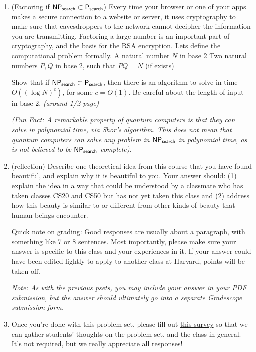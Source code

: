 \documentclass[11pt]{article}
\begin{document}
\begin{enumerate}
\item (Factoring if $\mathsf{NP_{search}}\subset \mathsf{P_{search}}$) Every time your browser or one of your apps makes a secure connection to a website or server, it uses cryptography to make sure that eavesdroppers to the network cannot decipher the information you are transmitting. Factoring a large number is an important part of cryptography, and the basis for the RSA encryption. Lets define the computational problem formally.
\compprob{\Factoring}
        {A natural number $N$ in base 2}
        {Two natural numbers $P,Q$ in base 2, such that $PQ=N$ (if exists)}

Show that if $\mathsf{NP_{search}}\subset \mathsf{P_{search}}$, then there is an algorithm to solve \Factoring in time $O((\log N)^c)$, for some $c=O(1)$. Be careful about the length of input in base 2. \textit{(around 1/2 page)}

\textit{(Fun Fact: A remarkable property of quantum computers is that they can solve \Factoring in polynomial time, via Shor's algorithm. This does not mean that quantum computers can solve any problem in $\mathsf{NP_{search}}$ in polynomial time, as \Factoring is not believed to be $\mathsf{NP_{search}}$-complete).
}\\

\item (reflection) Describe one theoretical idea from this course that you have found beautiful, and explain why it is beautiful to you.  Your answer should: (1) explain the idea in a way that could be understood by a classmate who has taken classes CS20 and CS50 but has not yet taken this class and (2) address how this beauty is similar to or different from other kinds of beauty that human beings encounter.

Quick note on grading: Good responses are usually about a paragraph, with something like 7 or 8 sentences. Most importantly, please make sure your answer is specific to this class and your experiences in it. If your answer could have been edited lightly to apply to another class at Harvard, points will be taken off.

\textit{Note: As with the previous psets, you may include your answer in your PDF submission, but the answer should ultimately go into a separate Gradescope submission form.}

\item Once you're done with this problem set, please fill out \href{https://forms.gle/b2yJAorxffJSueVd6}{this survey} so that we can gather students' thoughts on the problem set, and the class in general. It's not required, but we really appreciate all responses!

\end{enumerate}
\end{document}
